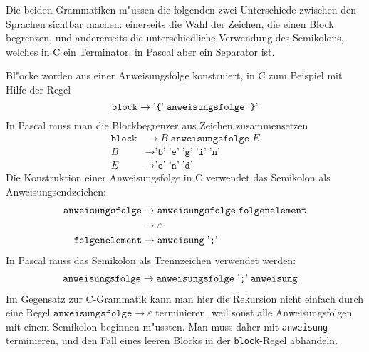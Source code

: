 \begin{loesung}
Die beiden Grammatiken m"ussen die folgenden zwei Unterschiede zwischen
den Sprachen sichtbar machen: einerseits die Wahl der Zeichen,
die einen Block begrenzen, und andererseits die unterschiedliche
Verwendung des Semikolons, welches
in C ein Terminator, in Pascal aber ein Separator ist.

Bl"ocke worden aus einer Anweisungsfolge konstruiert, in C zum Beispiel
mit Hilfe der Regel
\[
\texttt{block}
\rightarrow
\text{'{\tt \{}'}\;\texttt{anweisungsfolge}\; \text{'{\tt\}}'}
\]
In Pascal muss man die Blockbegrenzer aus Zeichen zusammensetzen
\begin{align*}
\texttt{block}
&\rightarrow
B\; \texttt{anweisungsfolge}\;E
\\
B&\rightarrow
\text{'}\texttt{b}\text{'}\;
\text{'}\texttt{e}\text{'}\;
\text{'}\texttt{g}\text{'}\;
\text{'}\texttt{i}\text{'}\;
\text{'}\texttt{n}\text{'}
\\
E&\rightarrow
\text{'}\texttt{e}\text{'}\;
\text{'}\texttt{n}\text{'}\;
\text{'}\texttt{d}\text{'}
\end{align*}
Die Konstruktion einer Anweisungsfolge in C verwendet das Semikolon als
Anweisungsendzeichen:
\begin{align*}
\texttt{anweisungsfolge}
&\rightarrow
\texttt{anweisungsfolge}
\;
\texttt{folgenelement}
\\
&\rightarrow\varepsilon
\\
\texttt{folgenelement}
&\rightarrow 
\texttt{anweisung}
\;\text{'{\tt ;}'}
\end{align*}
In Pascal muss das Semikolon als Trennzeichen verwendet werden:
\begin{align*}
\texttt{anweisungsfolge}
&\rightarrow
\texttt{anweisungsfolge} \; \text{'{\tt ;}'}\; \texttt{anweisung}
\end{align*}
Im Gegensatz zur C-Grammatik kann man hier die Rekursion nicht einfach
durch eine Regel $\texttt{anweisungsfolge}\to \varepsilon$ terminieren,
weil sonst alle Anweisungsfolgen mit einem Semikolon beginnen m"ussten.
Man muss daher mit \texttt{anweisung} terminieren, und den Fall eines
leeren Blocks in der \texttt{block}-Regel abhandeln.


\end{loesung}
